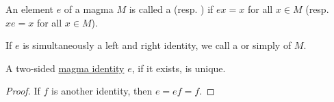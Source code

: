 \begin{definition}\label{def:magma_identity}
  An element \( e \) of a magma \( M \) is called a  (resp. ) if \( ex = x \) for all \( x \in M \) (resp. \( xe = x \) for all \( x \in M \)).

  If \( e \) is simultaneously a left and right identity, we call a  or simply  of \( M \).
\end{definition}

\begin{proposition}\label{thm:magma_identity_unique}
  A two-sided \hyperref[def:magma_identity]{magma identity} \( e \), if it exists, is unique.
\end{proposition}
\begin{proof}
  If \( f \) is another identity, then \( e = ef = f \).
\end{proof}

